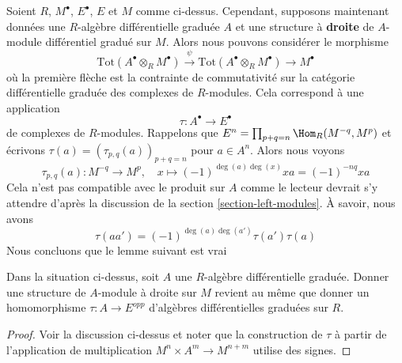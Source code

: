 \noindent
Soient $R$, $M^\bullet$, $E^\bullet$, $E$ et $M$ comme ci-dessus.
Cependant, supposons maintenant données une $R$-algèbre différentielle graduée $A$ et
une structure à {\bf droite} de $A$-module différentiel gradué sur $M$. Alors
nous pouvons considérer le morphisme
$$
\text{Tot}(A^\bullet \otimes_R M^\bullet)
\xrightarrow{\psi}
\text{Tot}(A^\bullet \otimes_R M^\bullet)
\to
M^\bullet
$$
où la première flèche est la contrainte de commutativité sur la
catégorie différentielle graduée des complexes de $R$-modules. Cela
correspond à une application
$$
\tau : A^\bullet \longrightarrow E^\bullet
$$
de complexes de $R$-modules. Rappelons que
$E^n = \prod_{p + q = n} \Hom_R(M^{-q}, M^p)$ et
écrivons $\tau(a) = (\tau_{p, q}(a))_{p + q = n}$ pour $a \in A^n$. Alors
nous voyons
$$
\tau_{p, q}(a) : M^{-q} \longrightarrow M^p,\quad
x \longmapsto (-1)^{\deg(a)\deg(x)}x a = (-1)^{-nq}xa
$$
Cela n'est pas compatible avec le produit sur $A$ comme le lecteur devrait s'y
attendre d'après la discussion de la section \ref{section-left-modules}. À
savoir, nous avons
$$
\tau(a a') = (-1)^{\deg(a)\deg(a')}\tau(a') \tau(a)
$$
Nous concluons que le lemme suivant est vrai

\begin{lemma}
\label{lemma-right-module-structure}
Dans la situation ci-dessus, soit $A$ une $R$-algèbre différentielle graduée.
Donner une structure de $A$-module à droite sur $M$ revient au même que
donner un homomorphisme $\tau : A \to E^{opp}$
d'algèbres différentielles graduées sur $R$.
\end{lemma}

\begin{proof}
Voir la discussion ci-dessus et noter que la construction de $\tau$ à partir
de l'application de multiplication $M^n \times A^m \to M^{n + m}$
utilise des signes.
\end{proof}

